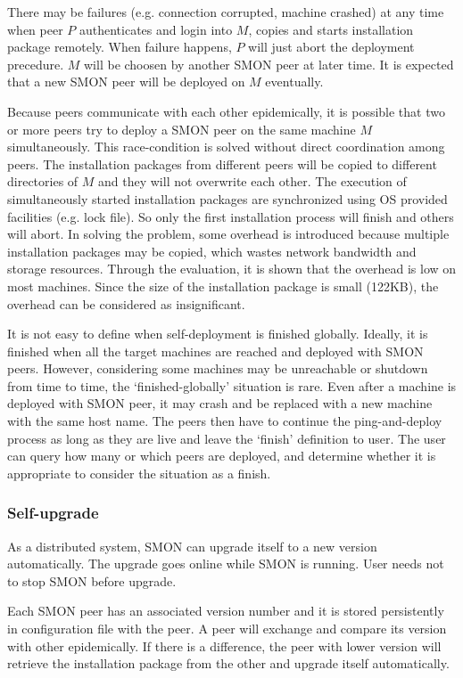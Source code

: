 There may be failures (e.g. connection corrupted, machine
crashed) at any time when peer $P$ authenticates and login
into $M$, copies and starts installation package remotely.
When failure happens, $P$ will just abort the deployment
precedure. $M$ will be choosen by another SMON peer at later
time. It is expected that a new SMON peer will be deployed
on $M$ eventually.

Because peers communicate with each other epidemically, it
is possible that two or more peers try to deploy a SMON peer
on the same machine $M$ simultaneously. This race-condition
is solved without direct coordination among peers. The
installation packages from different peers will be copied to
different directories of $M$ and they will not overwrite
each other. The execution of simultaneously started
installation packages are synchronized using OS provided
facilities (e.g. lock file). So only the first installation
process will finish and others will abort. In solving the
problem, some overhead is introduced because multiple
installation packages may be copied, which wastes network
bandwidth and storage resources. Through the evaluation, it
is shown that the overhead is low on most machines. Since
the size of the installation package is small (122KB), the
overhead can be considered as insignificant.

It is not easy to define when self-deployment is finished
globally. Ideally, it is finished when all the target
machines are reached and deployed with SMON peers.  However,
considering some machines may be unreachable or shutdown
from time to time, the `finished-globally' situation is
rare. Even after a machine is deployed with SMON peer, it
may crash and be replaced with a new machine with the same
host name. The peers then have to continue the
ping-and-deploy process as long as they are live and leave
the `finish' definition to user. The user can query how many
or which peers are deployed, and determine whether it is
appropriate to consider the situation as a finish.

\subsubsection*{Self-upgrade}

As a distributed system, SMON can upgrade itself to a new
version automatically. The upgrade goes online while SMON is
running. User needs not to stop SMON before upgrade.

Each SMON peer has an associated version number and it is
stored persistently in configuration file with the peer.  A
peer will exchange and compare its version with other epidemically. If
there is a difference, the peer with lower version will
retrieve the installation package from the other and upgrade
itself automatically.


